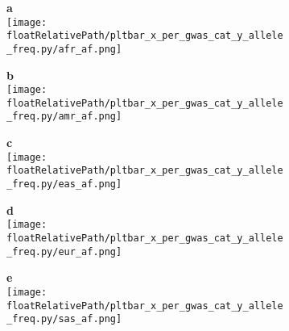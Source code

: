 \begin{figure}[!tbp]

    \begin{subfigure}[]{.32\textwidth}
        \textbf{a}
        \\
        \texttt{[image: \\floatRelativePath/pltbar\_x\_per\_gwas\_cat\_y\_allele\_freq.py/afr\_af.png]}
    \end{subfigure}
%
    \begin{subfigure}[]{.32\textwidth}
        \textbf{b}
        \\
        \texttt{[image: \\floatRelativePath/pltbar\_x\_per\_gwas\_cat\_y\_allele\_freq.py/amr\_af.png]}
    \end{subfigure}
%
    \begin{subfigure}[]{.32\textwidth}
        \textbf{c}
        \\
        \texttt{[image: \\floatRelativePath/pltbar\_x\_per\_gwas\_cat\_y\_allele\_freq.py/eas\_af.png]}
    \end{subfigure}

    \centering
    \begin{subfigure}[]{.32\textwidth}
        \textbf{d}
        \\
        \texttt{[image: \\floatRelativePath/pltbar\_x\_per\_gwas\_cat\_y\_allele\_freq.py/eur\_af.png]}
    \end{subfigure}
%
    \begin{subfigure}[]{.32\textwidth}
        \textbf{e}
        \\
        \texttt{[image: \\floatRelativePath/pltbar\_x\_per\_gwas\_cat\_y\_allele\_freq.py/sas\_af.png]}
    \end{subfigure}

\caption{}

\end{figure}
